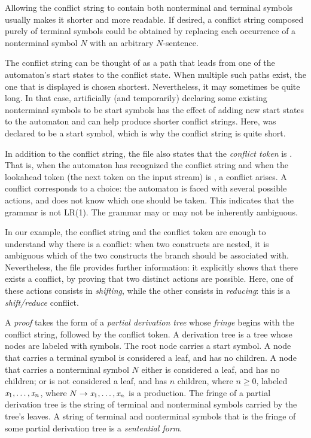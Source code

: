 \documentclass[onecolumn,11pt,nocopyrightspace,preprint]{sigplanconf}
\begin{document}
Allowing the conflict string to contain both nonterminal and terminal symbols
usually makes it shorter and more readable. If desired, a conflict string
composed purely of terminal symbols could be obtained by replacing each
occurrence of a nonterminal symbol $N$ with an arbitrary $N$-sentence.

The conflict string can be thought of as a path that leads from one of the
automaton's start states to the conflict state.  When multiple such paths
exist, the one that is displayed is chosen shortest.  Nevertheless, it may
sometimes be quite long. In that case, artificially (and temporarily)
declaring some existing nonterminal symbols to be start symbols has the effect
of adding new start states to the automaton and can help produce shorter
conflict strings. Here,  was declared to be a start symbol,
which is why the conflict string is quite short.

In addition to the conflict string, the \conflicts file also states that the
\emph{conflict token} is . That is, when the automaton has recognized
the conflict string and when the lookahead token (the next token on the input
stream) is , a conflict arises. A conflict corresponds to a
choice: the automaton is faced with several possible actions, and does not
know which one should be taken. This indicates that the grammar is not LR(1).
The grammar may or may not be inherently ambiguous.

In our example, the conflict string and the conflict token are enough to
understand why there is a conflict: when two  constructs are nested,
it is ambiguous which of the two constructs the
 branch should be associated with. Nevertheless, the \conflicts file
provides further information: it explicitly shows that there exists a
conflict, by proving that two distinct actions are possible. Here, one of
these actions consists in \emph{shifting}, while the other consists in
\emph{reducing}: this is a \emph{shift/reduce} conflict.

A \emph{proof} takes the form of a \emph{partial derivation tree} whose
\emph{fringe} begins with the conflict string, followed by the conflict
token. A derivation tree is a tree whose nodes are labeled with symbols. The
root node carries a start symbol. A node that carries a terminal symbol is
considered a leaf, and has no children. A node that carries a nonterminal
symbol $N$ either is considered a leaf, and has no children; or is not
considered a leaf, and has $n$ children, where $n\geq 0$, labeled
$\textit{x}_1,\ldots,\textit{x}_n$, where $N \rightarrow
\textit{x}_1,\ldots,\textit{x}_n$ is a production. The fringe of a partial
derivation tree is the string of terminal and nonterminal symbols carried by
the tree's leaves. A string of terminal and nonterminal symbols that is the
fringe of some partial derivation tree is a \emph{sentential form}.
\end{document}

